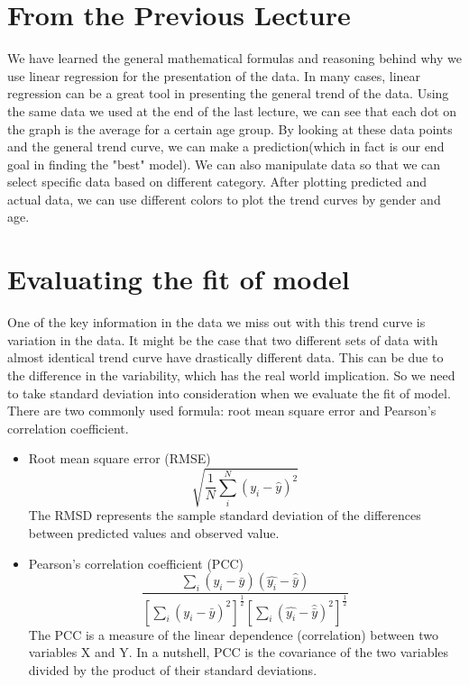 \section{From the Previous Lecture}

We have learned the general mathematical formulas and reasoning behind why we use linear regression for the presentation of the data. In many cases, linear regression can be a great tool in presenting the general trend of the data. 
Using the same data we used at the end of the last lecture, we can see that each dot on the graph is the average for a certain age group. By looking at these data points and the general trend curve, we can make a prediction(which in fact is our end goal in finding the "best" model). We can also manipulate data so that we can select specific data based on different category. After plotting predicted and actual data, we can use different colors to plot the trend curves by gender and age.

\section{Evaluating the fit of model}

One of the key information in the data we miss out with this trend curve is variation in the data. It might be the case that two different sets of data with almost identical trend curve have drastically different data. This can be due to the difference in the variability, which has the real world implication. So we need to take standard deviation into consideration when we evaluate the fit of model. There are two commonly used formula: root mean square error and Pearson's correlation coefficient.
\begin{itemize}
\item Root mean square error (RMSE)\[\sqrt{\frac{1}{N}\sum_{i}^{N}(y_i-\hat{y})^2}\]
The RMSD represents the sample standard deviation of the differences between predicted values and observed value. 
\item Pearson's correlation coefficient (PCC)\[\frac{\sum_i(y_i-\bar{y})(\hat{y_i}-\hat{\bar{y}})}{[\sum_i(y_i-\bar{y})^2]^\frac{1}{2}[\sum_i(\hat{y_i}-\hat{\bar{y}})^2]^\frac{1}{2}}\]
The PCC is a measure of the linear dependence (correlation) between two variables X and Y. In a nutshell, PCC is the covariance of the two variables divided by the product of their standard deviations. 
\end{itemize}

